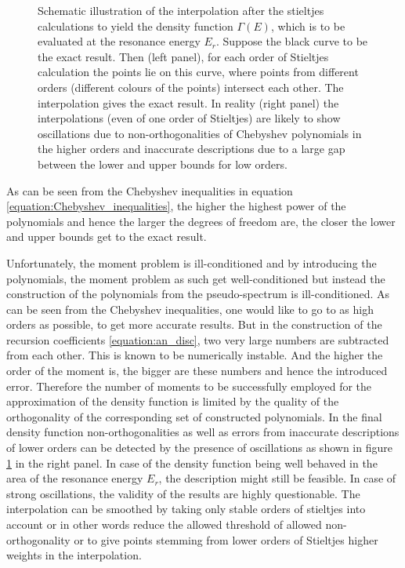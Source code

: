 \begin{figure}[h]
  \centering
  
  \caption{Schematic illustration of the interpolation after the
           stieltjes calculations to yield the density function $\Gamma(E)$,
           which is to be evaluated at the resonance energy $E_r$.
           Suppose the black curve to be the
           exact result. Then (left panel), for each order of Stieltjes calculation
           the points lie on this curve, where points from different orders
           (different colours of the points) intersect each other. The interpolation
           gives the exact result. In reality (right panel) the
           interpolations (even of one order of Stieltjes)
           are likely to show oscillations due to non-orthogonalities of
           Chebyshev polynomials in the higher orders and inaccurate descriptions
           due to a large gap between the lower and upper bounds for low
           orders.}
  \label{figure:stieltjes_density}
\end{figure}

As can be seen from the Chebyshev inequalities in
equation \ref{equation:Chebyshev_inequalities}, the higher the highest
power of the polynomials and hence the larger the degrees of freedom are,
the closer the lower and upper bounds get to the exact result.

Unfortunately, the moment problem is ill-conditioned and by introducing
the polynomials, the moment problem as such get well-conditioned but instead
the construction of the polynomials from the pseudo-spectrum is ill-conditioned.
As can be seen from the Chebyshev inequalities, one would like to go to as
high orders as possible, to get more accurate results. But in the construction
of the recursion coefficients \ref{equation:an_disc}, two very large numbers
are subtracted from each other. This is known to be numerically instable.
And the higher the order of the moment is, the bigger
are these numbers and hence the introduced error. Therefore the number
of moments to be successfully employed for the approximation of the
density function is limited by the quality of the orthogonality of
the corresponding set of constructed polynomials. In the final density function
non-orthogonalities as well as errors from inaccurate descriptions of lower
orders can be detected by the presence of oscillations as shown in
figure \ref{figure:stieltjes_density} in the right panel. In case of the density
function being well behaved in the area of the resonance energy $E_r$, the
description might still be feasible. In case of strong oscillations, the validity
of the results are highly questionable. The interpolation can be smoothed
by taking only stable orders of stieltjes into account or in other words
reduce the allowed threshold of allowed non-orthogonality or to give points
stemming from lower orders of Stieltjes higher weights in the interpolation.
